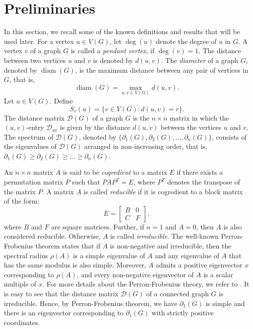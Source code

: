 \documentclass[12pt]{article}
\DeclareMathOperator{\diam}{diam}
\begin{document}
{{			\section{Preliminaries}\label{sec_pre}
			In this section, we recall some of the known definitions and results that will be used later.
			For a vertex $u\in V(G)$, let $\deg(u)$ denote the degree of $u$ in $G$. A vertex $v$ of a graph $G$ is called a \textit{pendant vertex}, if $\deg(v) =1$. The distance between two vertices $u$ and $v$ is denoted by $d(u,v)$. The \textit{diameter} of a graph $G$, denoted by $\diam(G)$, is the maximum distance between any pair of vertices in $G$, that is,
			$$
			\diam(G)=\max_{ u,v \in V(G)} d(u,v).
			$$
			Let $u \in V(G)$. Define 
			$$
			S_r(u)=\biggl\{v \in V(G) : d(u,v)=r \biggl\}.
			$$
			The distance matrix $\mathcal{D}(G)$ of a graph $G$ is the $n \times n$ matrix in which the $(u,v)$-entry $\mathcal{D}_{uv}$ is given by the distance $d(u,v)$ between the vertices $u$ and $v$. The spectrum of $\mathcal{D}(G)$, denoted by  $\{\partial_1(G),\partial_2(G),\dots,\partial_n(G)\}$, consists of the eigenvalues of $\mathcal{D}(G)$ arranged in non-increasing order, that is, $\partial_1 (G) \geq \partial_2 (G) \geq \dots \geq \partial_n (G)$.
			
			An $n \times n$ matrix $A$ is said to be \textit{cogredient} to a matrix $E$ if there exists a permutation matrix $P$ such that $PAP^T=E$, where $P^T$ denotes the transpose of the matrix $P$. A matrix $A$ is called \textit{reducible} if it is cogredient to a block matrix of the form:
			$$
			E = \begin{bmatrix}
				B & 0 \\
				C & F
			\end{bmatrix},
			$$ where $B$ and $F$ are square matrices. Further, if $n=1$ and $A=0$, then $A$ is also considered reducible. Otherwise, $A$ is called \textit{irreducible}.
			The well-known Perron-Frobenius theorem states that if $A$ is non-negative and irreducible, then the spectral radius $\rho(A)$ is a simple eigenvalue of $A$   and any eigenvalue of $A$ that has the same modulus is also simple. Moreover, $A$ admits a positive eigenvector $x$ corresponding to $\rho(A)$, and every non-negative eigenvector of $A$ is a scalar multiple of $x$. For more details about the Perron-Frobenius theory, we refer to \cite{Non-negative-matrices}.  It is easy to see that the distance matrix $\mathcal{D}(G)$ of a connected graph $G$ is irreducible. Hence, by Perron-Frobenius theorem, we have $\partial_1(G)$ is simple and there is an eigenvector corresponding to $\partial_1(G)$ with strictly positive coordinates. 
			
}}
\end{document}
